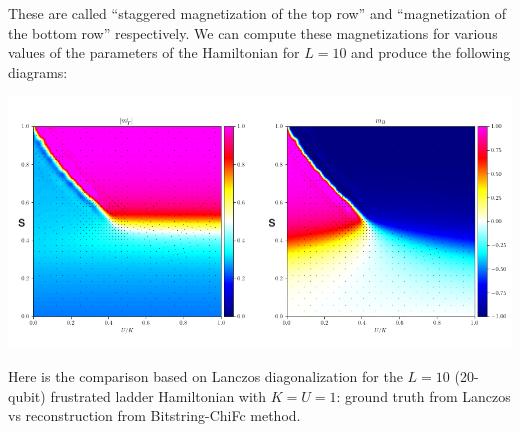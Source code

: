 \documentclass[american,aps,pra,reprint,floatfix,nofootinbib,superscriptaddress]{revtex4-2}
\begin{document}
These are called ``staggered magnetization of the top row'' and ``magnetization
of the bottom row'' respectively. We can compute these magnetizations for various
values of the parameters of the Hamiltonian for $L=10$ and produce the
following diagrams:

\includegraphics[width=\dimexpr\columnwidth-10.0pt]{lanczos_chi0_gp.png}

Here is the comparison based on Lanczos diagonalization for the $L=10$ (20-qubit)
frustrated ladder Hamiltonian with $K=U=1$: ground truth from Lanczos
vs reconstruction from Bitstring-ChiFc method.
\end{document}
